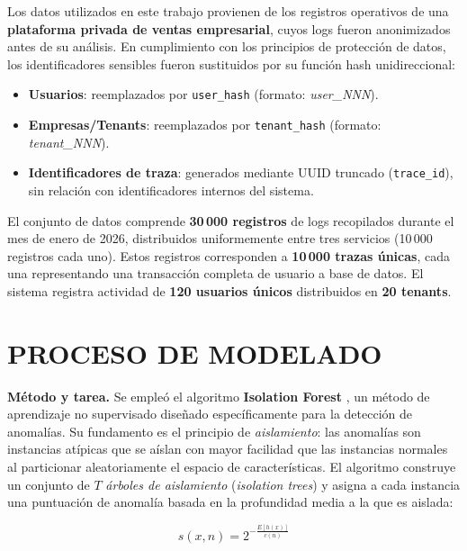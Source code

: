 \documentclass[12pt,letterpaper, oneside]{book}
\begin{document}
    Los datos utilizados en este trabajo provienen de los registros
    operativos de una \textbf{plataforma privada de ventas empresarial},
    cuyos logs fueron anonimizados antes de su análisis. En cumplimiento
    con los principios de protección de datos, los identificadores sensibles
    fueron sustituidos por su función hash unidireccional:

    \begin{itemize}
        \item \textbf{Usuarios}: reemplazados por \texttt{user\_hash}
        (formato: \textit{user\_NNN}).
        \item \textbf{Empresas/Tenants}: reemplazados por
        \texttt{tenant\_hash} (formato: \textit{tenant\_NNN}).
        \item \textbf{Identificadores de traza}: generados mediante UUID
        truncado (\texttt{trace\_id}), sin relación con identificadores
        internos del sistema.
    \end{itemize}

    El conjunto de datos comprende \textbf{30\,000 registros} de logs
    recopilados durante el mes de enero de 2026, distribuidos
    uniformemente entre tres servicios (10\,000 registros cada uno).
    Estos registros corresponden a \textbf{10\,000 trazas únicas}, cada
    una representando una transacción completa de usuario a base de datos.
    El sistema registra actividad de \textbf{120 usuarios únicos}
    distribuidos en \textbf{20 tenants}.

    \section{PROCESO DE MODELADO}

    \textbf{Método y tarea.} Se empleó el algoritmo
    \textbf{Isolation Forest} \citep{liu2008isolation, liu2012isolation},
    un método de aprendizaje no supervisado diseñado específicamente para
    la detección de anomalías. Su fundamento es el principio de
    \textit{aislamiento}: las anomalías son instancias atípicas que se
    aíslan con mayor facilidad que las instancias normales al particionar
    aleatoriamente el espacio de características. El algoritmo construye
    un conjunto de $T$ \textit{árboles de aislamiento} (\textit{isolation
    trees}) y asigna a cada instancia una puntuación de anomalía basada
    en la profundidad media a la que es aislada:

    \begin{equation}
        s(x, n) = 2^{-\frac{E[h(x)]}{c(n)}}
    \end{equation}
\end{document}
